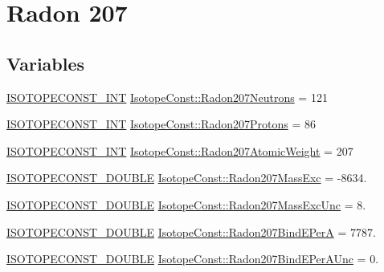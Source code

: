 \hypertarget{group___isotope_const-_radon-_rn207}{}\section{Radon 207}
\label{group___isotope_const-_radon-_rn207}
\subsection*{Variables}
\begin{DoxyCompactItemize}
\item 
\mbox{\hyperlink{group___isotope_const-_macros_ga5f18360b3e99483a35c32d789e62621c}{I\+S\+O\+T\+O\+P\+E\+C\+O\+N\+S\+T\+\_\+\+I\+NT}} \mbox{\hyperlink{group___isotope_const-_radon-_rn207_gaeb16e4ba0950d90cd9ba2e5ae74949fc}{Isotope\+Const\+::\+Radon207\+Neutrons}} = 121
\item 
\mbox{\hyperlink{group___isotope_const-_macros_ga5f18360b3e99483a35c32d789e62621c}{I\+S\+O\+T\+O\+P\+E\+C\+O\+N\+S\+T\+\_\+\+I\+NT}} \mbox{\hyperlink{group___isotope_const-_radon-_rn207_gad86ea53e7e1dce0b2d1b3f172e707173}{Isotope\+Const\+::\+Radon207\+Protons}} = 86
\item 
\mbox{\hyperlink{group___isotope_const-_macros_ga5f18360b3e99483a35c32d789e62621c}{I\+S\+O\+T\+O\+P\+E\+C\+O\+N\+S\+T\+\_\+\+I\+NT}} \mbox{\hyperlink{group___isotope_const-_radon-_rn207_ga0b34e39b950c96cf1724b01a740c82ea}{Isotope\+Const\+::\+Radon207\+Atomic\+Weight}} = 207
\item 
\mbox{\hyperlink{group___isotope_const-_macros_ga8f45a7272ce02c0b4c65c44636ed719a}{I\+S\+O\+T\+O\+P\+E\+C\+O\+N\+S\+T\+\_\+\+D\+O\+U\+B\+LE}} \mbox{\hyperlink{group___isotope_const-_radon-_rn207_gac71129d286199b200ed4a5227380ec6f}{Isotope\+Const\+::\+Radon207\+Mass\+Exc}} = -\/8634.
\item 
\mbox{\hyperlink{group___isotope_const-_macros_ga8f45a7272ce02c0b4c65c44636ed719a}{I\+S\+O\+T\+O\+P\+E\+C\+O\+N\+S\+T\+\_\+\+D\+O\+U\+B\+LE}} \mbox{\hyperlink{group___isotope_const-_radon-_rn207_ga829d953e88ff404eeceac436b948b30d}{Isotope\+Const\+::\+Radon207\+Mass\+Exc\+Unc}} = 8.
\item 
\mbox{\hyperlink{group___isotope_const-_macros_ga8f45a7272ce02c0b4c65c44636ed719a}{I\+S\+O\+T\+O\+P\+E\+C\+O\+N\+S\+T\+\_\+\+D\+O\+U\+B\+LE}} \mbox{\hyperlink{group___isotope_const-_radon-_rn207_gadf738b5f9d6329cdcdf0b22b6102ff37}{Isotope\+Const\+::\+Radon207\+Bind\+E\+PerA}} = 7787.
\item 
\mbox{\hyperlink{group___isotope_const-_macros_ga8f45a7272ce02c0b4c65c44636ed719a}{I\+S\+O\+T\+O\+P\+E\+C\+O\+N\+S\+T\+\_\+\+D\+O\+U\+B\+LE}} \mbox{\hyperlink{group___isotope_const-_radon-_rn207_gaaab834800294bd7fda4319db15e74d7f}{Isotope\+Const\+::\+Radon207\+Bind\+E\+Per\+A\+Unc}} = 0.

\end{DoxyCompactItemize}
